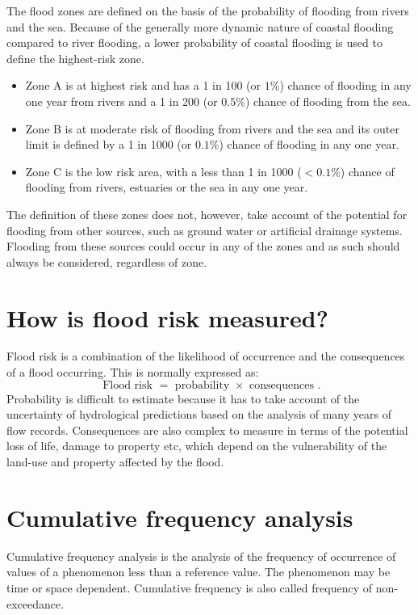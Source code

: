 \documentclass[12pt, a4paper]{article}
\theoremstyle{plain}
\theoremstyle{definition}
\theoremstyle{remark}
\begin{document}
The flood zones are defined on the basis of the probability of flooding from
rivers and the sea. Because of the generally more dynamic nature of coastal
flooding compared to river flooding, a lower probability of coastal flooding is
used to define the highest-risk zone.
\begin{itemize}
\item Zone A is at highest risk and has a 1 in 100 (or $1\%$) chance of flooding in any
one year from rivers and a 1 in 200 (or $0.5\%$) chance of flooding from the
sea.
\item Zone B is at moderate risk of flooding from rivers and the sea and its outer limit
is defined by a 1 in 1000 (or $0.1\%$) chance of flooding in any one year.
\item Zone C is the low risk area, with a less than 1 in 1000 ($<0.1\%$) chance of
flooding from rivers, estuaries or the sea in any one year.
\end{itemize}
The definition of these zones does not, however, take account of the potential
for flooding from other sources, such as ground water or artificial drainage
systems. Flooding from these sources could occur in any of the zones and as
such should always be considered, regardless of zone.

\section{ How is flood risk measured?}
Flood risk is a combination of the likelihood of occurrence and the consequences of a flood occurring. This is normally expressed as:
\[ \mbox{ Flood risk } = \mbox{ probability } \times \mbox { consequences }.\]
Probability is difficult to estimate because it has to take account of the uncertainty of hydrological predictions based on the analysis of many years of flow records. Consequences are also complex to measure in terms of the
potential loss of life, damage to property etc, which depend on the vulnerability of the land-use and property affected by the flood.



\section{Cumulative frequency analysis}

Cumulative frequency analysis is the analysis of the frequency of occurrence of values of a phenomenon less than a reference value. The phenomenon may be time or space dependent. Cumulative frequency is also called frequency of non-exceedance.
\end{document}
